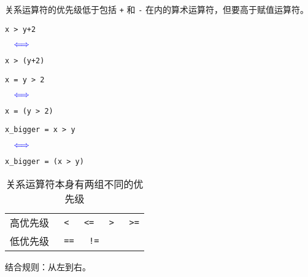 \begin{frame}[fragile]
关系运算符的优先级低于包括 \lstinline|+| 和 \lstinline|-| 在内的算术运算符，但要高于赋值运算符。 \pause \vspace{.15in}

\begin{minipage}{.4\textwidth}
\begin{lstlisting}
x > y+2
\end{lstlisting}
\end{minipage}$~~~\textcolor{blue}\Longleftrightarrow~~~$
\begin{minipage}{.4\textwidth}
\begin{lstlisting}
x > (y+2)
\end{lstlisting}
\end{minipage} \vspace{.1in}

\begin{minipage}{.4\textwidth}
\begin{lstlisting}
x = y > 2
\end{lstlisting}
\end{minipage}$~~~\textcolor{blue}\Longleftrightarrow~~~$
\begin{minipage}{.4\textwidth}
\begin{lstlisting}
x = (y > 2)
\end{lstlisting}
\end{minipage}\vspace{.1in}


\begin{minipage}{.4\textwidth}
\begin{lstlisting}
x_bigger = x > y
\end{lstlisting}
\end{minipage}$~~~\textcolor{blue}\Longleftrightarrow~~~$
\begin{minipage}{.4\textwidth}
\begin{lstlisting}
x_bigger = (x > y)
\end{lstlisting}
\end{minipage}
\end{frame}

\begin{frame}[fragile]
\begin{table}
\centering
\caption{关系运算符本身有两组不同的优先级}
\begin{tabular}{p{2cm}|p{4cm}}\hline
高优先级 & \lstinline| <   <=   >   >=|\\[0.1in]
低优先级 & \lstinline| ==   !=|\\\hline
\end{tabular}
\end{table}

\begin{center}
结合规则：从左到右。
\end{center}
\end{frame}


